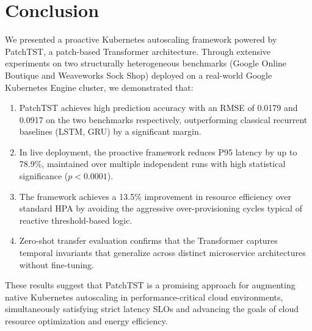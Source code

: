 \documentclass[conference]{IEEEtran}
\begin{document}
\section{Conclusion}\label{sec:conclusion}

We presented a proactive Kubernetes autoscaling framework powered by PatchTST, a patch-based Transformer architecture. Through extensive experiments on two structurally heterogeneous benchmarks (Google Online Boutique and Weaveworks Sock Shop) deployed on a real-world Google Kubernetes Engine cluster, we demonstrated that:

\begin{enumerate}
    \item PatchTST achieves high prediction accuracy with an RMSE of 0.0179 and 0.0917 on the two benchmarks respectively, outperforming classical recurrent baselines (LSTM, GRU) by a significant margin.
    \item In live deployment, the proactive framework reduces P95 latency by up to 78.9\%, maintained over multiple independent runs with high statistical significance ($p < 0.0001$).
    \item The framework achieves a 13.5\% improvement in resource efficiency over standard HPA by avoiding the aggressive over-provisioning cycles typical of reactive threshold-based logic.
    \item Zero-shot transfer evaluation confirms that the Transformer captures temporal invariants that generalize across distinct microservice architectures without fine-tuning.
\end{enumerate}

These results suggest that PatchTST is a promising approach for augmenting native Kubernetes autoscaling in performance-critical cloud environments, simultaneously satisfying strict latency SLOs and advancing the goals of cloud resource optimization and energy efficiency.
\end{document}
